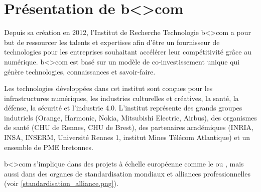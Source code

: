 \chapter{Présentation de b<>com}

\par
Depuis sa création en 2012, l'Institut de Recherche Technologie b<>com a pour but de ressourcer les talents et expertises afin d’être un fournisseur de technologies pour les entreprises souhaitant accélérer leur compétitivité grâce au numérique. b<>com est basé sur un modèle de co-investissement unique qui génère technologies, connaissances et savoir-faire.


\par
Les technologies développées dans cet institut sont conçues pour les infrastructures numériques, les industries culturelles et créatives, la santé, la défense, la sécurité et l’industrie 4.0. L'institut représente des grands groupes indutriels (Orange, Harmonic, Nokia, Mitsubishi Electric, Airbus), des organismes de santé (CHU de Rennes, CHU de Brest), des partenaires académiques (INRIA, INSA, INSERM, Université Rennes 1, institut Mines Télécom Atlantique) et un ensemble de PME bretonnes.

\par
b<>com s'implique dans des projets à échelle européenne comme le  ou , mais aussi dans des organes de standardisation mondiaux et alliances professionnelles (voir \ref{standardisation_alliance.png}).



